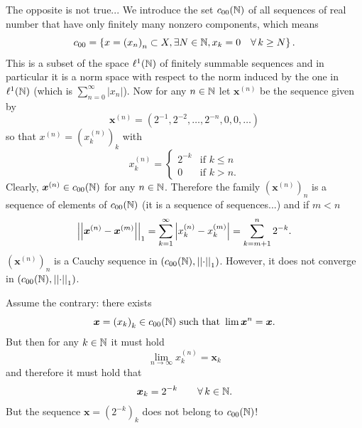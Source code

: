 \documentclass{article}
\begin{document}
The opposite is not true... We introduce the set $c_{00}(\mathbb{N})$ of all sequences of real number that have only finitely many nonzero components, which means
\begin{equation*}
	c_{00}=\left\{x={(x_{n})}_{n}\subset X,\exists N\in\mathbb{N},x_{k}=0\quad\forall\, k\geq N\right\}.
\end{equation*}
This is a subset of the space $\ell^{1}(\mathbb{N})$ of finitely summable  sequences and in particular it is a norm space with respect to the norm induced by the one in $\ell^{1}(\mathbb{N})$ (which is $\sum_{n=0}^{\infty}|x_{n}|$). Now for any $n\in\mathbb{N}$ let $\bm{x}^{(n)}$ be the sequence given by
\begin{equation*}
	\bm{x}^{(n)}=(2^{-1},2^{-2},\ldots,2^{-n},0,0,\ldots)
\end{equation*}
so that $x^{(n)}={\left(x_{k}^{(n)}\right)}_{k}$ with \begin{equation*}
	x_{k}^{(n)}=\begin{cases}
		2^{-k}&\text{if }k\leq n\\
		0&\text{if }k>n.
	\end{cases}
\end{equation*}
Clearly, $\bm{x}^{(n)}\in c_{00}(\mathbb{N})$ for any $n\in\mathbb{N}$. Therefore the family ${\left(\bm{x}^{(n)}\right)}_{n}$ is a sequence of elements of $c_{00}(\mathbb{N})$ (it is a sequence of sequences...) and if $m<n$
\begin{equation*}
	\left|\left|\bm{x}^{(n)}-\bm{x}^{(m)}\right|\right|_{1}=\sum_{k=1}^{\infty}\left|x_{k}^{(n)}-x_{k}^{(m)}\right|=\sum_{k=m+1}^{n}2^{-k}.
\end{equation*}
${\left(\bm{x}^{(n)}\right)}_{n}$ is a Cauchy sequence in $\left(c_{00}(\mathbb{N}),\left|\left|\cdot\right|\right|_{1}\right)$. However, it does not converge in $\left(c_{00}(\mathbb{N}),\left|\left|\cdot\right|\right|_{1}\right)$.
\begin{fancyproof}
	Assume the contrary: there exists 
	\begin{equation*}
		\bm{x}={\left(x_{k}\right)}_{k}\in c_{00}(\mathbb{N})\text{ such that }\lim\bm{x}^{n}=\bm{x}.
	\end{equation*}
	But then for any $k\in\mathbb{N}$ it must hold
	\begin{equation*}
		\lim_{n\to\infty}x_{k}^{(n)}=\bm{x}_{k}
	\end{equation*}
	and therefore it must hold that
	\begin{equation*}
		\bm{x}_{k}=2^{-k}\qquad\forall\, k\in\mathbb{N}.
	\end{equation*}
	But the sequence $\bm{x}={\left(2^{-k}\right)}_{k}$ does not belong to $c_{00}(\mathbb{N})$!
\end{fancyproof}
\end{document}
